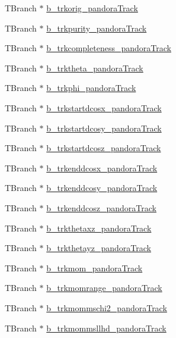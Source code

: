 \begin{DoxyCompactItemize}
T\-Branch $\ast$ \hyperlink{classanatree_aa4e2282952d618cc0fb28f98e02a292f}{b\-\_\-trkorig\-\_\-pandora\-Track}
\item 
T\-Branch $\ast$ \hyperlink{classanatree_a5566276bcad3e1cff7e2b6d24c202055}{b\-\_\-trkpurity\-\_\-pandora\-Track}
\item 
T\-Branch $\ast$ \hyperlink{classanatree_adec982c55072c93c49201fd47c0b8025}{b\-\_\-trkcompleteness\-\_\-pandora\-Track}
\item 
T\-Branch $\ast$ \hyperlink{classanatree_a869e4f8b2b677a8346b211c6690555db}{b\-\_\-trktheta\-\_\-pandora\-Track}
\item 
T\-Branch $\ast$ \hyperlink{classanatree_a82f05bdd37129948f382b46359c63579}{b\-\_\-trkphi\-\_\-pandora\-Track}
\item 
T\-Branch $\ast$ \hyperlink{classanatree_a38c205267ecbb57908995438749b43ed}{b\-\_\-trkstartdcosx\-\_\-pandora\-Track}
\item 
T\-Branch $\ast$ \hyperlink{classanatree_aea07ba810413c75c05c22d16e222c000}{b\-\_\-trkstartdcosy\-\_\-pandora\-Track}
\item 
T\-Branch $\ast$ \hyperlink{classanatree_a36feb3589817a5bd0431cade34ece996}{b\-\_\-trkstartdcosz\-\_\-pandora\-Track}
\item 
T\-Branch $\ast$ \hyperlink{classanatree_a35f18863079da3510c2b203cb0dc63a0}{b\-\_\-trkenddcosx\-\_\-pandora\-Track}
\item 
T\-Branch $\ast$ \hyperlink{classanatree_abdbaf3a2673795d79336932b27046308}{b\-\_\-trkenddcosy\-\_\-pandora\-Track}
\item 
T\-Branch $\ast$ \hyperlink{classanatree_aa92df6504e77bb1b812f64a92fa60c45}{b\-\_\-trkenddcosz\-\_\-pandora\-Track}
\item 
T\-Branch $\ast$ \hyperlink{classanatree_af7cf0dc9b50e153a03e509ceeb580e5c}{b\-\_\-trkthetaxz\-\_\-pandora\-Track}
\item 
T\-Branch $\ast$ \hyperlink{classanatree_a91e36647bf3e09234016a2e0a0c3f7e1}{b\-\_\-trkthetayz\-\_\-pandora\-Track}
\item 
T\-Branch $\ast$ \hyperlink{classanatree_a9ab3395c21f184f841c34055bf61c341}{b\-\_\-trkmom\-\_\-pandora\-Track}
\item 
T\-Branch $\ast$ \hyperlink{classanatree_a8c596f870bc8c1c2260ff93b757efa6c}{b\-\_\-trkmomrange\-\_\-pandora\-Track}
\item 
T\-Branch $\ast$ \hyperlink{classanatree_adff23f0d3e964de61ba28b8b99062c09}{b\-\_\-trkmommschi2\-\_\-pandora\-Track}
\item 
T\-Branch $\ast$ \hyperlink{classanatree_a973b219744deea321547c65c1ff09db8}{b\-\_\-trkmommsllhd\-\_\-pandora\-Track}

\end{DoxyCompactItemize}
